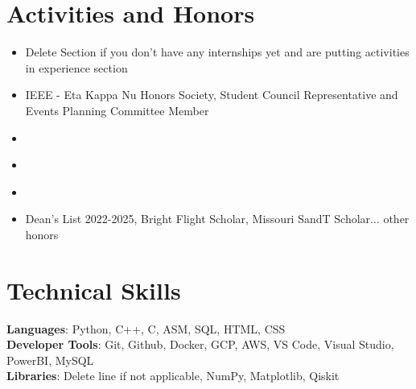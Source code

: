 \documentclass[letterpaper,11pt]{article}
\newcommand{\resumeItem}[1]{
  \item\small{
    {#1 \vspace{-2pt}}
  }
}
\newcommand{\resumeItemListStart}{\begin{itemize}}
\newcommand{\resumeItemListEnd}{\end{itemize}\vspace{-5pt}}
\begin{document}
\section{Activities and Honors}
    \resumeItemListStart
        \resumeItem{Delete Section if you don't have any internships yet and are putting activities in experience section}
        \resumeItem{IEEE - Eta Kappa Nu Honors Society, Student Council Representative and Events Planning Committee Member}
        \resumeItem{}
        \resumeItem{}
        \resumeItem{}
        \resumeItem{Dean’s List 2022-2025, Bright Flight Scholar, Missouri SandT Scholar... other honors}
    \resumeItemListEnd

\section{Technical Skills}
 \begin{itemize}[leftmargin=0.15in, label={}]
    \small{\item{
     \textbf{Languages}{: Python, C++, C, ASM, SQL, HTML, CSS} \\
     \textbf{Developer Tools}{: Git, Github, Docker, GCP, AWS, VS Code, Visual Studio, PowerBI, MySQL} \\
     \textbf{Libraries}{: Delete line if not applicable, NumPy, Matplotlib, Qiskit}
    }}
 \end{itemize}
\end{document}

